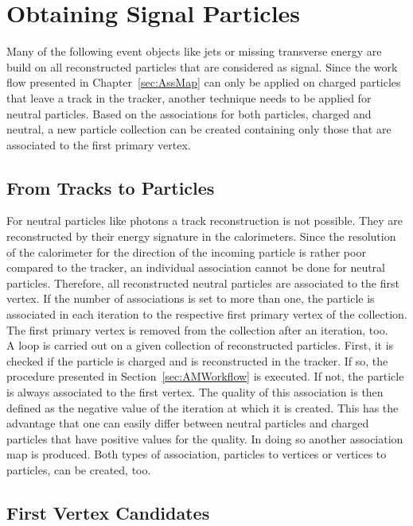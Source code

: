 \chapter{Obtaining Signal Particles \label{sec:OSP} }

Many of the following event objects like jets or missing transverse energy are build on all reconstructed particles that are considered as signal. Since the work flow presented in Chapter~\ref{sec:AssMap} can only be applied on charged particles that leave a track in the tracker, another technique needs to be applied for neutral particles. Based on the associations for both particles, charged and neutral, a new particle collection can be created containing only those that are associated to the first primary vertex.

\section{From Tracks to Particles \label{sec:OSPT2P}}

For neutral particles like photons a track reconstruction is not possible. They are reconstructed by their energy signature in the calorimeters. Since the resolution of the calorimeter for the direction of the incoming particle is rather poor compared to the tracker, an individual association cannot be done for neutral particles. Therefore, all reconstructed neutral particles are associated to the first vertex. If the number of associations is set to more than one, the particle is associated in each iteration to the respective first primary vertex of the collection. The first primary vertex is removed from the collection after an iteration, too. \\
A loop is carried out on a given collection of reconstructed particles. First, it is checked if the particle is charged and is reconstructed in the tracker. If so, the procedure presented in Section~\ref{sec:AMWorkflow} is executed. If not, the particle is always associated to the first vertex. The quality of this association is then defined as the negative value of the iteration at which it is created.  This has the advantage that one can easily differ between neutral particles and charged particles that have positive values for the quality. In doing so another association map is produced. Both types of association, particles to vertices or vertices to particles, can be created, too.

\section{First Vertex Candidates \label{sec:OSPFVC}}

